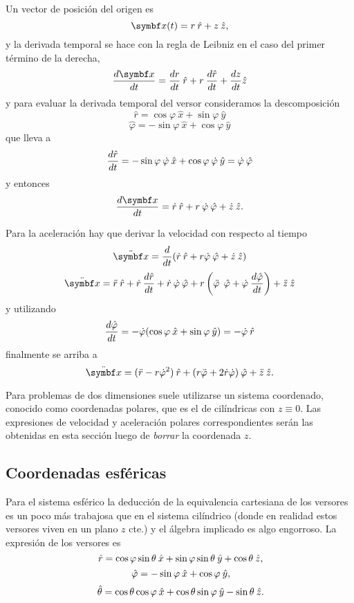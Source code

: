 \documentclass[10pt,oneside]{CBFT_book}
\begin{document}
Un vector de posición del origen es 
\[
	\vb{x}(t) = r \:\hat{r} + z \:\hat{z},
\]
y la derivada temporal se hace con la regla de Leibniz en el caso del primer término de la derecha, 
\[
	\dtot{\vb{x}}{t} = \dtot{r}{t} \:\hat{r} + r \:\dtot{\hat{r}}{t} + \dtot{z}{t} \hat{z}
\]
y para evaluar la derivada temporal del versor consideramos la descomposición 
\[
	\hat{r} = \cos \varphi \:\hat{x} + \sin \varphi \:\hat{y}
\]
\[
	\hat{\varphi} = -\sin \varphi  \:\hat{x} + \cos  \varphi \:\hat{y}
\]
que lleva a 
\[
	\frac{d^{\hspace{-0.05em}} {\hat{r}}}{d {t}^{\hspace{-0.05em}}} = - \sin \varphi \: \dot{ \varphi } \:\hat{x} + \cos \varphi \: \dot{ \varphi } \:\hat{y} =
	\dot{\varphi} \: \hat{\varphi}
\]
y entonces 
\[
	\dtot{\vb{x}}{t} = \dot{r} \:\hat{r } + r \:\dot{\vp} \: \hat{\vp} + \dot{z} \:\hat{z}.
\]

Para la aceleración hay que derivar la velocidad con respecto al tiempo
\[
	\ddot{\vb{x}} = \dtot{}{t} ( \dot{r} \: \hat{r} + r\dot{\vp} \: \hat{\vp} + \dot{z} \:\hat{z} ) 
\]
\[
	\ddot{\vb{x}} = \ddot{r} \:\hat{r} + \dot{r} \: \dtot{\hat{r}}{t} + \dot{r} \: \dot{\vp} \: \hat{\vp}
	+ r \left( \ddot{\vp} \: \phiver + \dot{\vp} \: \dtot{\hat{\vp}}{t} \right) + \ddot{z} \:\hat{z}
\]
y utilizando 
\[
	\frac{d^{\hspace{-0.05em}} {\hat{\varphi}}}{d {t}^{\hspace{-0.05em}}} = - \dot{ \varphi } ( \cos \varphi \:\hat{x} + \sin  \varphi \:\hat{y} ) = - \dot{\varphi} \: \hat{r}
\]
finalmente se arriba a
\[
	\ddot{\vb{x}} = ( \ddot{r} - r\dot{\vp}^2 ) \rver + ( r\ddot{\vp} + 2 \dot{r} \dot{\vp} ) \phiver + \ddot{z} \:\hat{z}.
\]

Para problemas de dos dimensiones suele utilizarse un sistema coordenado, conocido como coordenadas polares, que es el de 
cilíndricas con $ z \equiv 0 $. Las expresiones de velocidad y aceleración polares correspondientes serán las obtenidas en esta sección
luego de {\it borrar} la coordenada $z$.

\subsection{Coordenadas esféricas}

Para el sistema esférico la deducción de la equivalencia cartesiana de los versores es un poco más trabajosa que en el sistema cilíndrico (donde en 
realidad estos versores viven en un plano $z$ cte.) y el álgebra implicado es algo engorroso. La expresión de los versores es
\[
	\:\hat{r} = \cos\varphi \sin\theta\:\hat{x} + \sin\varphi\sin\theta\:\hat{y} + \cos\theta\:\hat{z},
\]
\[
	\:\hat{\varphi} = -\sin\varphi \:\hat{x} + \cos\varphi \:\hat{y},
\]
\[
	\:\hat{\theta} = \cos\theta \cos\varphi \:\hat{x} + \cos\theta\sin\varphi\:\hat{y} - \sin\theta\:\hat{z}.
\]
\end{document}
